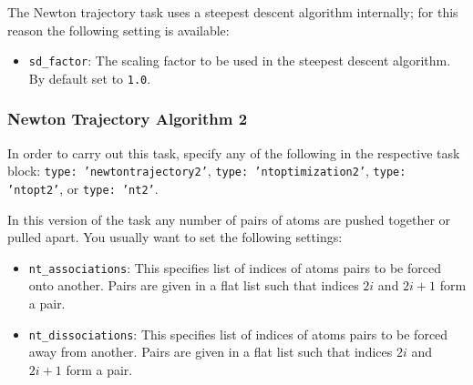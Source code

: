\documentclass[]{tufte-book}
\begin{document}
The Newton trajectory task uses a steepest descent algorithm internally; for this reason the following setting is available:
\begin{itemize}
\item \texttt{sd\_factor}: The scaling factor to be used in the steepest descent algorithm. By default set to \texttt{1.0}.
\end{itemize}

\subsubsection{Newton Trajectory Algorithm 2}
In order to carry out this task, specify any of the following in the respective task block:
\texttt{type: 'newtontrajectory2'}, \texttt{type: 'ntoptimization2'}, \texttt{type: 'ntopt2'}, or \texttt{type: 'nt2'}.

In this version of the task any number of pairs of atoms are pushed together or pulled apart.
You usually want to set the following settings:
\begin{itemize}
\item \texttt{nt\_associations}: This specifies list of indices of atoms pairs to be forced onto another.
 Pairs are given in a flat list such that indices $2i$ and $2i+1$ form a pair.
\item \texttt{nt\_dissociations}: This specifies list of indices of atoms pairs to be forced away from another.
 Pairs are given in a flat list such that indices $2i$ and $2i+1$ form a pair.
\end{itemize}
\end{document}

